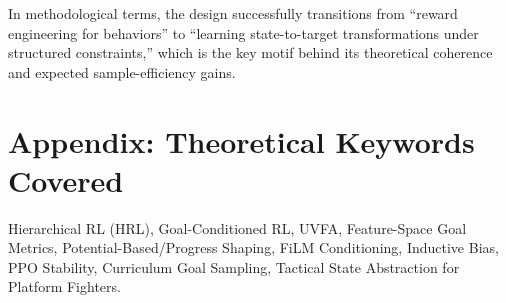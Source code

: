 \documentclass[11pt,a4paper]{article}
\begin{document}
In methodological terms, the design successfully transitions from ``reward engineering for behaviors'' to ``learning state-to-target transformations under structured constraints,'' which is the key motif behind its theoretical coherence and expected sample-efficiency gains.

\section*{Appendix: Theoretical Keywords Covered}
Hierarchical RL (HRL), Goal-Conditioned RL, UVFA, Feature-Space Goal Metrics, Potential-Based/Progress Shaping, FiLM Conditioning, Inductive Bias, PPO Stability, Curriculum Goal Sampling, Tactical State Abstraction for Platform Fighters.
\end{document}
